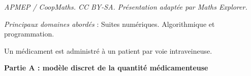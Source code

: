 \documentclass[10pt]{article}
\begin{document}
\noindent\textit{APMEP / CoopMaths. CC BY-SA. Présentation adaptée par Maths Explorer.}\par\medskip
\medskip

\emph{Principaux domaines abordés} : Suites numériques. Algorithmique et programmation.

\medskip

Un médicament est administré à un patient par voie intraveineuse. 

\bigskip

\textbf{Partie A : modèle discret de la quantité médicamenteuse}

\medskip
\end{document}
